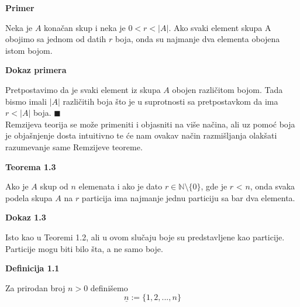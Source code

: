\documentclass[12pt,a4paper]{article}
\begin{document}
	\vspace{0.5em}
	{\noindent\fontsize{12pt}{12pt}\textbf{Primer}}
	\vspace{0.5em}

	\noindent Neka je $A$ konačan skup i neka je $0 < r < |A|$.
	Ako svaki element skupa A obojimo sa jednom od datih $r$ boja, onda su najmanje dva
	elementa obojena istom bojom.
	\vspace{1.5em}

	{\noindent\fontsize{12pt}{12pt}\textbf{Dokaz primera}}
	\vspace{0.5em}	

	\noindent Pretpostavimo da je svaki element iz skupa $A$ obojen različitom bojom. Tada bismo
	imali $|A|$ različitih boja što je u suprotnosti sa pretpostavkom da ima $r < |A|$ boja. $\blacksquare$\\

	\noindent Remzijeva teorija se može primeniti i objasniti na više načina, ali uz pomoć boja 
	je objašnjenje dosta intuitivno te će nam ovakav način razmišljanja olakšati razumevanje same Remzijeve teoreme.

	\vspace{0.5em}
	{\noindent\fontsize{12pt}{12pt}\textbf{Teorema 1.3}}
	\vspace{0.5em}

	\noindent Ako je $A$ skup od $n$ elemenata i ako je dato $r \in \mathbb{N}\setminus \lbrace 0 \rbrace$, gde je $r$ < $n$, onda svaka podela skupa $A$ na $r$ particija ima najmanje jednu particiju sa bar dva elementa.
	\vspace{1.5em}

	{\noindent\fontsize{12pt}{12pt}\textbf{Dokaz 1.3}}
	\vspace{0.5em}

	\noindent Isto kao u Teoremi 1.2, ali u ovom slučaju boje su predstavljene kao particije.
	Particije mogu biti bilo šta, a ne samo boje.

	\vspace{0.5em}
	
	\begin{mdframed}
	
	{\noindent\fontsize{12pt}{12pt}\textbf{Definicija 1.1}}
	\vspace{0.5em}

	\noindent Za prirodan broj $n > 0$ definišemo\\
	\[\underline{n} := \lbrace1, 2, . . . , n \rbrace\]	
	
	\end{mdframed}	
	
\end{document}
